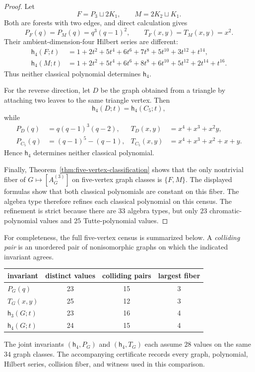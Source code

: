 \documentclass[11pt]{amsart}
\theoremstyle{plain}
\theoremstyle{definition}
\theoremstyle{remark}
\begin{document}
\begin{proof}
Let
\[
  F=P_3\sqcup2K_1,
  \qquad
  M=2K_2\sqcup K_1.
\]
Both are forests with two edges, and direct calculation gives
\[
  P_F(q)=P_M(q)=q^3(q-1)^2,
  \qquad
  T_F(x,y)=T_M(x,y)=x^2.
\]
Their ambient-dimension-four Hilbert series are different:
\begin{align*}
  \mathsf h_4(F;t)
  &={}
  1+2t^2+5t^4+6t^6+7t^8+5t^{10}+3t^{12}+t^{14},\\
  \mathsf h_4(M;t)
  &={}
  1+2t^2+5t^4+6t^6+8t^8+6t^{10}+5t^{12}+2t^{14}+t^{16}.
\end{align*}
Thus neither classical polynomial determines $\mathsf h_4$.

For the reverse direction, let $D$ be the graph obtained from a triangle by
attaching two leaves to the same triangle vertex.  Then
\[
  \mathsf h_4(D;t)=\mathsf h_4(C_5;t),
\]
while
\begin{align*}
  P_D(q)&=q(q-1)^3(q-2),
  &T_D(x,y)&=x^4+x^3+x^2y,\\
  P_{C_5}(q)&=(q-1)^5-(q-1),
  &T_{C_5}(x,y)&=x^4+x^3+x^2+x+y.
\end{align*}
Hence $\mathsf h_4$ determines neither classical polynomial.

Finally, Theorem~\ref{thm:five-vertex-classification} shows that the only
nontrivial fiber of $G\mapsto[A_G^{(3)}]$ on five-vertex graph classes is
$\{F,M\}$.  The displayed formulas show that both classical polynomials are
constant on this fiber.  The algebra type therefore refines each classical
polynomial on this census.  The refinement is strict because there are $33$
algebra types, but only $23$ chromatic-polynomial values and $25$
Tutte-polynomial values.
\end{proof}

For completeness, the full five-vertex census is summarized below.  A
\emph{colliding pair} is an unordered pair of nonisomorphic graphs on which
the indicated invariant agrees.
\begin{center}
\small
\begin{tabular}{lccc}
\hline
invariant & distinct values & colliding pairs & largest fiber\\
\hline
$P_G(q)$ & 23 & 15 & 3\\
$T_G(x,y)$ & 25 & 12 & 3\\
$\mathsf h_3(G;t)$ & 23 & 16 & 4\\
$\mathsf h_4(G;t)$ & 24 & 15 & 4\\
\hline
\end{tabular}
\end{center}
The joint invariants $(\mathsf h_4,P_G)$ and $(\mathsf h_4,T_G)$ each assume
$28$ values on the same $34$ graph classes.  The accompanying certificate
 records every graph, polynomial,
Hilbert series, collision fiber, and witness used in this comparison.
\end{document}

